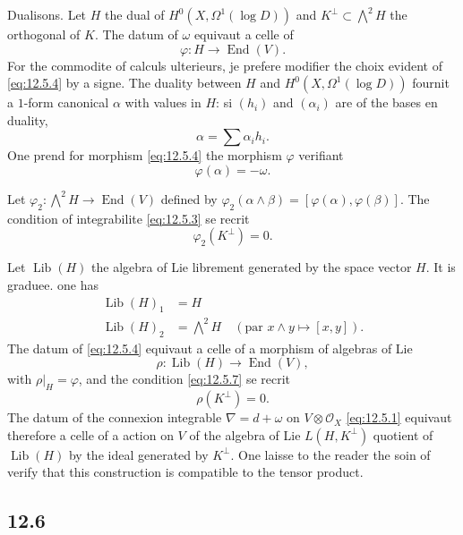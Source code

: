 \documentclass[12pt,a4paper]{article}
\theoremstyle{plain}
\theoremstyle{definition}
\theoremstyle{remark}
\DeclareMathOperator{\Lib}{Lib}
\DeclareMathOperator{\End}{End}
\newcommand{\cO}{\mathcal{O}}
\begin{document}
Dualisons. Let $H$ the dual of $H^0(X, \Omega^1(\log D))$ and $K^\perp \subset \bigwedge^2 H$ the orthogonal of $K$. The datum of $\omega$ equivaut a celle of
\begin{equation}\label{eq:12.5.4}
\varphi : H \to \End(V).
\end{equation}
For the commodite of calculs ulterieurs, je prefere modifier the choix evident of \eqref{eq:12.5.4} by a signe. The duality between $H$ and $H^0(X, \Omega^1(\log D))$ fournit a $1$-form canonical $\alpha$ with values in $H$: si $(h_i)$ and $(\alpha_i)$ are of the bases en duality,
\begin{equation}\label{eq:12.5.5}
\alpha = \sum \alpha_i h_i.
\end{equation}
One prend for morphism \eqref{eq:12.5.4} the morphism $\varphi$ verifiant
\begin{equation}\label{eq:12.5.6}
\varphi(\alpha) = -\omega.
\end{equation}

Let $\varphi_2 : \bigwedge^2 H \to \End(V)$ defined by $\varphi_2(\alpha \wedge \beta) = [\varphi(\alpha), \varphi(\beta)]$. The condition of integrabilite \eqref{eq:12.5.3} se recrit
\begin{equation}\label{eq:12.5.7}
\varphi_2(K^\perp) = 0.
\end{equation}

Let $\Lib(H)$ the algebra of Lie librement generated by the space vector $H$. It is graduee. one has
\begin{align*}
\Lib(H)_1 &= H \\
\Lib(H)_2 &= \textstyle\bigwedge^2 H \quad (\text{par } x \wedge y \mapsto [x,y]).
\end{align*}
The datum of \eqref{eq:12.5.4} equivaut a celle of a morphism of algebras of Lie
\begin{equation}\label{eq:12.5.8}
\rho : \Lib(H) \to \End(V),
\end{equation}
with $\rho|_H = \varphi$, and the condition \eqref{eq:12.5.7} se recrit
\begin{equation}\label{eq:12.5.9}
\rho(K^\perp) = 0.
\end{equation}
The datum of the connexion integrable $\nabla = d + \omega$ on $V \otimes \cO_X$ \eqref{eq:12.5.1} equivaut therefore a celle of a action on $V$ of the algebra of Lie $L(H, K^\perp)$ quotient of $\Lib(H)$ by the ideal generated by $K^\perp$. One laisse to the reader the soin of verify that this construction is compatible to the tensor product.

\subsection*{12.6}
\end{document}
